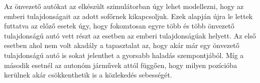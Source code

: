 Az önvezető autókat az elkészült szimulátorban úgy lehet modellezni, hogy az emberi tulajdonságait az adott sofőrnek kikapcsoljuk. Ezek alapján újra le lettek futtatva az előző esetek úgy, hogy fokozatosan egyre több és több önvezető tulajdonságú autó vett részt az esetben az emberi tulajdonságúak helyett. Az első esetben ahol nem volt akadály a tapasztalat az, hogy akár már egy önvezető tulajdonságú autó is sokat jelenthet a gyorsabb haladás szempontjából. Míg a második esetnél az autonóm járművek attól függően, hogy milyen pozícióba kerülnek akár csökkenthetik is a közlekedés sebességét.
